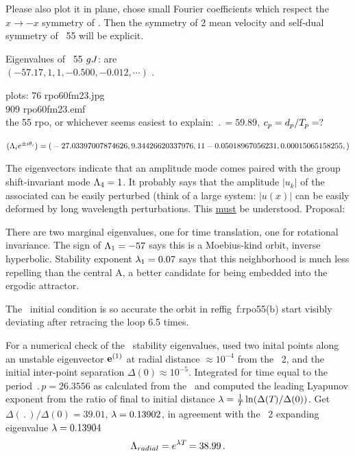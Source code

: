 Please also plot it in plane, chose small Fourier coefficients
 which respect the $x \to -x$ symmetry of \KSe.
Then the symmetry of 2 mean velocity
{\eqva} and self-dual symmetry of \rpo\ {\nameit}55 will be explicit.

Eigenvalues of \rpo\ {\nameit}55 $g\jMps$: are
\\
$(-57.17,  1, 1, -0.500, -0.012, \cdots)$ .
%

plots:
  76 rpo60fm23.jpg  \\
 909 rpo60fm23.emf  \\
the 55 rpo, or whichever seems easiest to explain:
$\period{} = 59.89$,
$c_p = \shift_p/\period{p}= ?$

$(\ExpaEig_i e^{\pm i\theta_i})=
(
\\
 -27.03397007874626,
\\
   9.34426620337976,
\\
   1
\\
   1
\\
  -0.05018967056231,
\\
   0.00015065158255,
)$

The eigenvectors
indicate that an amplitude mode comes paired with the
group shift-invariant mode $\ExpaEig_4 =1$. It probably says that
the amplitude $|u_k|$ of the associated can be easily perturbed (think of
a large system: $|u(x)|$ can be easily deformed by long wavelength
perturbations. This \underline{must} be understood. Proposal:

There are two
marginal eigenvalues, one for time translation, one for
rotational invariance.
The sign of $\ExpaEig_{1}=-57$ says this is a Moebius-kind orbit,
inverse hyperbolic.
Stability exponent
 $\eigExp[1]=0.07$ says that this neighborhood is much less repelling than
the central {\eqv} A, a better candidate for being embedded into the
ergodic attractor.

The \rpo\ initial condition is
so accurate the orbit in reffig~{f:rpo55}(b)
start visibly deviating after retracing the loop 6.5 times.

For a numerical check of the \rpo\ stability eigenvalues,
used two inital
points along an unstable eigenvector $\jEigvec{1}$
at radial distance  $\approx 10^{-4}$ from the \eqv\ {\nameit}2,
and the initial inter-point separation $\Delta(0) \approx 10^{-5}$.
Integrated for time equal to the period $\period{p}=26.3556$ as calculated from
the \jacobianM\ and computed the leading Lyapunov exponent from the ratio of
final to initial distance
$\Lyap= \frac{1 }{ \period{}}\ln( \Delta(\period{})/\Delta(0))$.
Get
$\Delta(\period{})/\Delta(0) =39.01$,
$\Lyap=0.13902$, in agreement with the \eqv\ {\nameit}2
expanding eigenvalue $\Lyap=0.13904$
\[
\ExpaEig_{radial} =  e^{\Lyap \period{}} =38.99
\,.
\]


